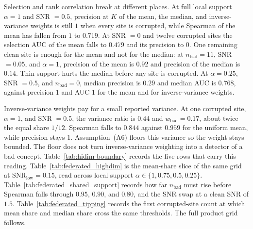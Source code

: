 Selection and rank correlation break at different places.
At full local support \(\alpha=1\) and SNR \(=0.5\), precision at \(K\) of
the mean, the median, and inverse-variance weights is still \(1\) when
every site is corrupted, while Spearman of the mean has fallen from \(1\)
to \(0.719\).
At SNR \(=0\) and twelve corrupted sites the selection AUC of the mean
falls to \(0.479\) and its precision to \(0\).
One remaining clean site is enough for the mean and not for the median:
at \(n_{\mathrm{bad}}=11\), SNR \(=0.05\), and \(\alpha=1\), precision of
the mean is \(0.92\) and precision of the median is \(0.14\).
Thin support hurts the median before any site is corrupted.
At \(\alpha=0.25\), SNR \(=0.5\), and \(n_{\mathrm{bad}}=0\), median
precision is \(0.29\) and median AUC is \(0.768\), against precision \(1\)
and AUC \(1\) for the mean and for inverse-variance weights.

Inverse-variance weights pay for a small reported variance.
At one corrupted site, \(\alpha=1\), and SNR \(=0.5\), the variance ratio
is \(0.44\) and \(w_{\mathrm{bad}}=0.17\), about twice the equal share
\(1/12\).
Spearman falls to \(0.844\) against \(0.959\) for the uniform mean, while
precision stays \(1\).
Assumption~(A6) floors this variance so the weight stays bounded.
The floor does not turn inverse-variance weighting into a detector of a
bad concept.
Table~\ref{tab:hidim-boundary} records the five rows that carry this
reading.
Table~\ref{tab:federated_highdim} is the mean-share slice of the same
grid at \(\mathrm{SNR}_{\mathrm{low}}=0.15\), read across local support
\(\alpha\in\{1,0.75,0.5,0.25\}\).
Table~\ref{tab:federated_shared_support} records how far \(n_{\mathrm{bad}}\)
must rise before Spearman falls through \(0.95\), \(0.90\), and \(0.80\),
and the SNR swap at a clean SNR of \(1.5\).
Table~\ref{tab:federated_tipping} records the first corrupted-site count
at which mean share and median share cross the same thresholds.
The full product grid follows.

